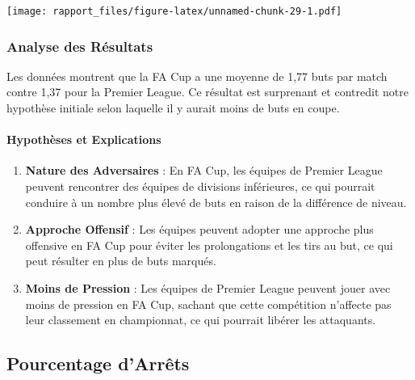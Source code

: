 \documentclass[
]{article}
\providecommand{\tightlist}{%
  \setlength{\itemsep}{0pt}\setlength{\parskip}{0pt}}
\begin{document}
\texttt{[image: rapport\_files/figure-latex/unnamed-chunk-29-1.pdf]}

\subsubsection{Analyse des Résultats}\label{analyse-des-ruxe9sultats}

Les données montrent que la FA Cup a une moyenne de 1,77 buts par match
contre 1,37 pour la Premier League. Ce résultat est surprenant et
contredit notre hypothèse initiale selon laquelle il y aurait moins de
buts en coupe.

\paragraph{Hypothèses et
Explications}\label{hypothuxe8ses-et-explications}

\begin{enumerate}
\def\labelenumi{\arabic{enumi}.}
\tightlist
\item
  \textbf{Nature des Adversaires} : En FA Cup, les équipes de Premier
  League peuvent rencontrer des équipes de divisions inférieures, ce qui
  pourrait conduire à un nombre plus élevé de buts en raison de la
  différence de niveau.
\item
  \textbf{Approche Offensif} : Les équipes peuvent adopter une approche
  plus offensive en FA Cup pour éviter les prolongations et les tirs au
  but, ce qui peut résulter en plus de buts marqués.
\item
  \textbf{Moins de Pression} : Les équipes de Premier League peuvent
  jouer avec moins de pression en FA Cup, sachant que cette compétition
  n'affecte pas leur classement en championnat, ce qui pourrait libérer
  les attaquants.
\end{enumerate}

\subsection{Pourcentage d'Arrêts}\label{pourcentage-darruxeats}
\end{document}

